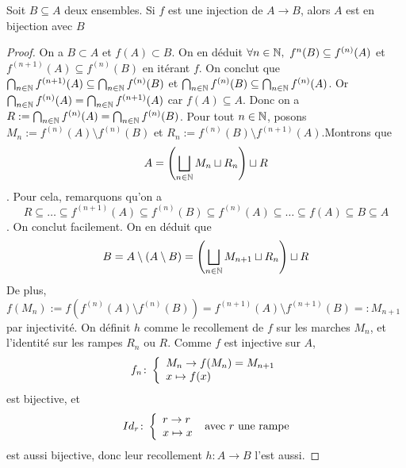 \begin{lemme}\label{card : lemme csb}
    Soit $B\subseteq A$ deux ensembles. Si $f$ est une injection de $A\to B$, alors $A$ est en bijection avec $B$
\end{lemme}

\begin{proof}     
        On a $B\subset A$ et $f(A)\subset B$. On en déduit $\forall n\in \N,\ f^n(B)\subseteq f^{(n)}(A)$ et $f^{(n+1)}(A)\subseteq f^{(n)}(B)$ en itérant $f$. On conclut que $\bigcap_{n\in\mathbb{N}}f^{(n+1)}(A)\subseteq\bigcap_{n\in\mathbb{N}}f^{(n)}(B)$ et $\bigcap_{n\in\mathbb{N}}f^{(n)}(B)\subseteq\bigcap_{n\in\mathbb{N}}f^{(n)}(A)$. Or $\bigcap_{n\in\mathbb{N}}f^{(n)}(A) = \bigcap_{n\in\mathbb{N}}f^{(n+1)}(A)$ car $f(A)\subseteq A$. Donc on a $R:=\bigcap_{n\in\mathbb{N}}f^{(n)}(A) = \bigcap_{n\in\mathbb{N}}f^{(n)}(B)$.  Pour tout $n\in\mathbb{N}$, posons $M_n := f^{(n)}(A)\setminus f^{(n)}(B)$ et $ R_n := f^{(n)}(B)\setminus f^{(n+1)}(A).$Montrons que $$A = \left(\bigsqcup_{n\in\mathbb{N}}M_n \sqcup R_n\right)\sqcup R$$. Pour cela, remarquons qu'on a 
        $$
        R\subseteq\ldots\subseteq f^{(n+1)}(A)\subseteq f^{(n)}(B)\subseteq f^{(n)}(A)\subseteq\ldots\subseteq f(A)\subseteq B\subseteq A
        $$. On conclut facilement. On en déduit que 
        $$B = A\setminus(A\setminus B) = \left(\bigsqcup_{n\in\mathbb{N}}M_{n+1} \sqcup R_n\right)\sqcup R$$
        De plus, $f(M_n) :=f(f^{(n)}(A)\setminus f^{(n)}(B)) = f^{(n+1)}(A)\setminus f^{(n+1)}(B)=:M_{n+1}$ par injectivité.  On définit $h$ comme le recollement de $f$ sur les marches $M_n$, et l'identité sur les rampes $R_n$ ou $R$. Comme $f$ est injective sur $A$, $$f_n\colon \left\{\begin{array}{l}M_n\to f(M_n) = M_{n+1} \\x\mapsto f(x)\end{array}\right.$$ est bijective, et $$Id_r\colon \left\{\begin{array}{l}r\to r \\x\mapsto x\end{array}\right.\text{ avec $r$ une rampe}$$ est aussi bijective, donc leur recollement $h:A\to B$ l'est aussi.
\end{proof} 


